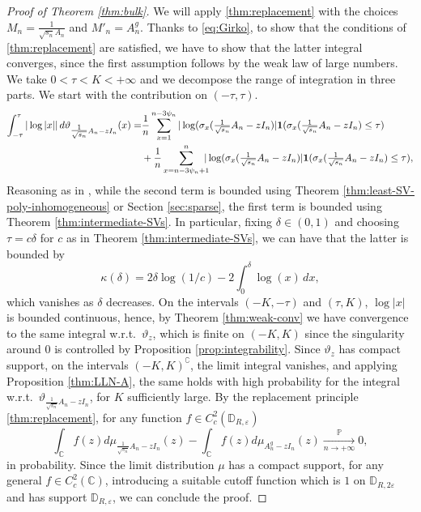 \documentclass[11pt,oneside]{amsart}
\theoremstyle{plain}
\numberwithin{equation}{section}
\newcommand{\eps}{\varepsilon}
\newcommand{\p}{\mathbb{P}}
\newcommand{\one}{\textup{\textbf{1}}}
\newcommand{\pconv}{\xrightarrow[\textit{n} \to +\infty]{\quad \p \quad}}
\newcommand{\scaling}{s_n}
\newcommand{\thetalimit}{\vartheta_z}
\begin{document}
\begin{proof}[{Proof of Theorem \ref{thm:bulk}}]
We will apply \ref{thm:replacement} with the choices $M_n = \frac{1}{\sqrt{\scaling}A_n}$ and $M'_n={A}_n^g$.
Thanks to \eqref{eq:Girko}, to show that the conditions of \ref{thm:replacement} are satisfied, we have to show that the latter integral converges, since the first assumption follows by the weak law of large numbers.
We take $ 0< \tau <K <+\infty$ and we decompose the range of integration in three parts. We start with the contribution on $(-\tau,\tau)$.
\begin{equation}
\begin{split}
 \int_{-\tau}^\tau |\log|x||\,d\vartheta_{\tfrac{1}{\sqrt{\scaling}}{A}_n-zI_n}(x) =& \frac{1}{n}\sum_{x=1}^{n-3\psi_n} |\log(\sigma_{x}(\tfrac{1}{\sqrt{\scaling}}{A}_n-zI_n)| \one(\sigma_{x}(\tfrac{1}{\sqrt{\scaling}}{A}_n-zI_n)\le \tau)\\
 &+\frac{1}{n}\sum_{x=n-3\psi_n+1}^{n} \!\!\!\!|\log(\sigma_{x}(\tfrac{1}{\sqrt{\scaling}}{A}_n-zI_n)|\one(\sigma_{x}(\tfrac{1}{\sqrt{\scaling}}{A}_n-zI_n)\le \tau), 
 \end{split}\end{equation}
 Reasoning as in \cite[p. 2410]{BasakRudelson19}, while the second term is bounded using Theorem \ref{thm:least-SV-poly-inhomogeneous} or Section \ref{sec:sparse}, the first term is bounded using Theorem \ref{thm:intermediate-SVs}. In particular, fixing $\delta \in (0,1)$ and choosing $\tau = c \delta$ for $c$ as in Theorem \ref{thm:intermediate-SVs}, we can have that the latter is bounded by
\begin{equation}
    \kappa(\delta)=2\delta \log(1/c)-2\int_0^\delta \log(x) \,dx,
\end{equation}
which vanishes as $\delta$ decreases. On the intervals $(-K,-\tau)$ and $(\tau,K)$, $\log|x|$ is bounded continuous, hence, by Theorem \ref{thm:weak-conv} we have convergence to the same integral w.r.t.\ $\thetalimit$, which is finite on $(-K,K)$ since the singularity around $0$ is controlled by Proposition \ref{prop:integrability}. Since $\thetalimit$ has compact support, on the intervals $(-K,K)^\complement$, the limit integral vanishes, and applying Proposition \ref{thm:LLN-A}, the same holds with high probability for the integral w.r.t.\ $\vartheta_{\tfrac{1}{\sqrt{\scaling}}{A}_n-zI_n}$, for $K$ sufficiently large. 
By the replacement principle \ref{thm:replacement}, for any function $f \in C^2_c(\mathbb{D}_{R,\eps})$
\begin{equation}
    \int_{\mathbb{C}} f(z) d\mu_{\tfrac{1}{\sqrt{\scaling}}A_n-zI_n}(z)- \int_{\mathbb{C}} f(z) d\mu_{{A}_n^g-zI_n}(z) \pconv 0,
\end{equation}
in probability.  Since the limit distribution $\mu$ has a compact support, for any general $f \in C^2_c(\mathbb{C})$, introducing a suitable cutoff function which is $1$ on $\mathbb{D}_{R,2\eps}$ and has support $\mathbb{D}_{R,\eps}$, we can conclude the proof.
\end{proof}
\end{document}
